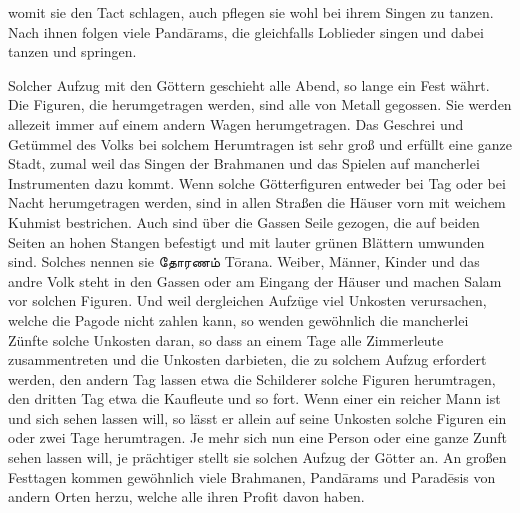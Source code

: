 \documentclass{article}
\newcommand{\TamilText}[1]{\texttamil{#1}}
\newcommand{\tam}[1]{\TamilText{#1}}
\begin{document}
womit sie den Tact schlagen, auch pflegen sie wohl bei ihrem Singen zu tanzen. Nach ihnen folgen viele Pand\={a}rams, die gleichfalls Loblieder singen und dabei tanzen und springen.

Solcher Aufzug mit den Göttern geschieht alle Abend, so lange ein Fest währt. Die Figuren, die herumgetragen werden, sind alle von Metall gegossen. Sie werden allezeit immer auf einem andern Wagen herumgetragen. Das Geschrei und Getümmel des Volks bei solchem Herumtragen ist sehr groß und erfüllt eine ganze Stadt, zumal weil das Singen der Brahmanen und das Spielen auf mancherlei Instrumenten dazu kommt. Wenn solche Götterfiguren entweder bei Tag oder bei Nacht herumgetragen werden, sind in allen Straßen die Häuser vorn mit weichem Kuhmist bestrichen. Auch sind über die Gassen Seile gezogen, die auf beiden Seiten an hohen Stangen befestigt und mit lauter grünen Blättern umwunden sind. Solches nennen sie \tam{தோரணம்} T\={o}rana. Weiber, Männer, Kinder und das andre Volk steht in den Gassen oder am Eingang der Häuser und machen Salam vor solchen Figuren. Und weil dergleichen Aufzüge viel Unkosten verursachen, welche die Pagode nicht zahlen kann, so wenden gewöhnlich die mancherlei Zünfte solche Unkosten daran, so dass an einem Tage alle Zimmerleute zusammentreten und die Unkosten darbieten, die zu solchem Aufzug erfordert werden, den andern Tag lassen etwa die Schilderer solche Figuren herumtragen, den dritten Tag etwa die Kaufleute und so fort. Wenn einer ein reicher Mann ist und sich sehen lassen will, so lässt er allein auf seine Unkosten solche Figuren ein oder zwei Tage herumtragen. Je mehr sich nun eine Person oder eine ganze Zunft sehen lassen will, je prächtiger stellt sie solchen Aufzug der Götter an. An großen Festtagen kommen gewöhnlich viele Brahmanen, Pand\={a}rams und Parad\={e}sis von andern Orten herzu, welche alle ihren Profit davon haben.
\end{document}
